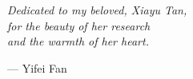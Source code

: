 \cleardoublepage

\vspace*{0.3\textheight}

\begin{center}
  \itshape\Large
  Dedicated to my beloved, Xiayu Tan, \\
  for the beauty of her research \\
  and the warmth of her heart.

  \vspace{1cm}

  --- Yifei Fan
\end{center}
